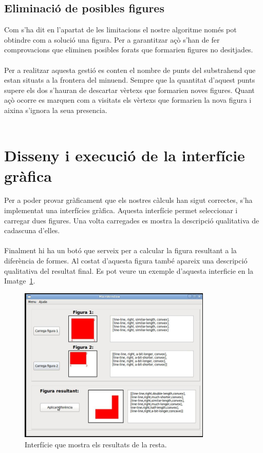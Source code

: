 \documentclass{article}
\begin{document}
\subsection{Eliminació de posibles figures}
Com s'ha dit en l'apartat de les limitacions el nostre algoritme només pot obtindre com a solució una figura.
Per a garantitzar açò s'han de fer comprovacions que eliminen posibles forats que formarien figures no desitjades.
\\
\\
Per a realitzar aquesta gestió es conten el nombre de punts del substrahend que estan situats a la frontera del minuend.
Sempre que la quantitat d'aquest punts supere els dos s'hauran de descartar vèrtexs que formarien noves figures.
Quant açò ocorre es marquen com a visitats els vèrtexs que formarien la nova figura i aixina s'ignora la seua presencia.
\\
\\
\section{Disseny i execució de la interfície gràfica}
Per a poder provar gràficament que els nostres càlculs han sigut correctes, s’ha implementat una interfícies gràfica.
Aquesta interfície permet seleccionar i carregar dues figures.
Una volta carregades es mostra la descripció qualitativa de cadascuna d’elles.
\\
\\
Finalment hi ha un botó que serveix per a calcular la figura resultant a la diferència de formes.
Al costat d’aquesta figura també apareix una descripció qualitativa del resultat final.
Es pot veure un exemple d'aquesta interficie en la Imatge~\ref{fig:iufinal}.

\begin{figure}[h]
\centering
\includegraphics[width=260pt]{images/iufinal_p.png}
\caption {Interfície que mostra els resultats de la resta.}
\label {fig:iufinal}
\end{figure}
\end{document}
